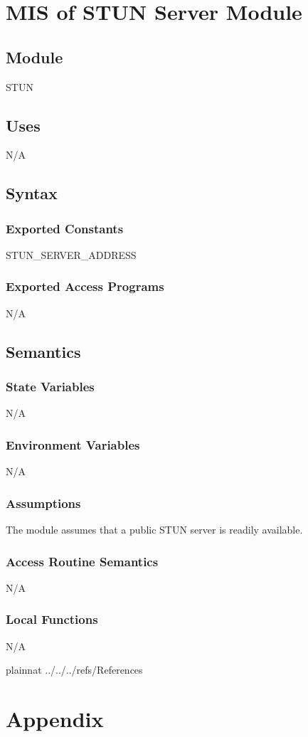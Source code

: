 \documentclass[12pt, titlepage]{article}
\begin{document}
\section{MIS of STUN Server Module} \label{sec:stunserver}

\subsection{Module}
STUN

\subsection{Uses}
N/A

\subsection{Syntax}

\subsubsection{Exported Constants}
STUN\_SERVER\_ADDRESS

\subsubsection{Exported Access Programs}
N/A

\subsection{Semantics}

\subsubsection{State Variables}
N/A

\subsubsection{Environment Variables}
N/A

\subsubsection{Assumptions}
The module assumes that a public STUN server is readily available.

\subsubsection{Access Routine Semantics}
N/A

\subsubsection{Local Functions}
N/A

\newpage

 {plainnat}
 {../../../refs/References}

\newpage

\section{Appendix} \label{Appendix}

\end{document}
